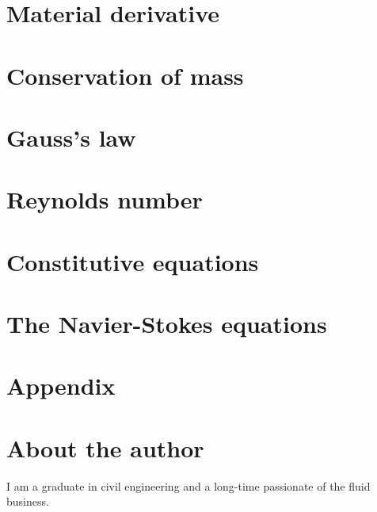 \documentclass[10pt]{report}
\begin{document}


\chapter{Material derivative}



\chapter{Conservation of mass}



\chapter{Gauss's law}

\chapter{Reynolds number}



\chapter{Constitutive equations}



\chapter{The Navier-Stokes equations}



\chapter*{Appendix}

\newpage
\thispagestyle{empty}

\chapter*{About the author}

I am a graduate in civil engineering and a long-time passionate of the fluid business.
\end{document}

